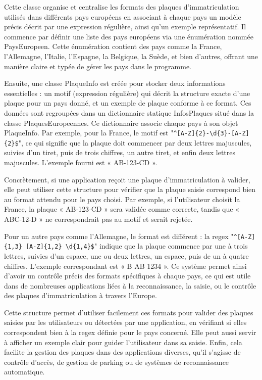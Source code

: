 \documentclass[main.tex]{subfiles}
\begin{document}
Cette classe organise et centralise les formats des plaques d’immatriculation utilisés dans différents pays européens en associant à chaque pays un modèle précis décrit par une expression régulière, ainsi qu’un exemple représentatif. Il commence par définir une liste des pays européens via une énumération nommée PaysEuropeen. Cette énumération contient des pays comme la France, l’Allemagne, l’Italie, l’Espagne, la Belgique, la Suède, et bien d’autres, offrant une manière claire et typée de gérer les pays dans le programme. 

Ensuite, une classe PlaqueInfo est créée pour stocker deux informations essentielles : un motif (expression régulière) qui décrit la structure exacte d’une plaque pour un pays donné, et un exemple de plaque conforme à ce format. Ces données sont regroupées dans un dictionnaire statique InfosPlaques situé dans la classe PlaquesEuropeennes. Ce dictionnaire associe chaque pays à son objet PlaqueInfo. Par exemple, pour la France, le motif est "\texttt{\^{}[A-Z]\{2\}-\textbackslash{}d\{3\}-[A-Z]\{2\}\$}", ce qui signifie que la plaque doit commencer par deux lettres majuscules, suivies d’un tiret, puis de trois chiffres, un autre tiret, et enfin deux lettres majuscules. L’exemple fourni est « AB-123-CD ». 

Concrètement, si une application reçoit une plaque d’immatriculation à valider, elle peut utiliser cette structure pour vérifier que la plaque saisie correspond bien au format attendu pour le pays choisi. Par exemple, si l’utilisateur choisit la France, la plaque « AB-123-CD » sera validée comme correcte, tandis que « ABC-12-D » ne correspondrait pas au motif et serait rejetée. 

Pour un autre pays comme l’Allemagne, le format est différent : la regex "\texttt{\^{}[A-Z]\{1,3\} [A-Z]\{1,2\} \textbackslash{}d\{1,4\}\$}" indique que la plaque commence par une à trois lettres, suivies d’un espace, une ou deux lettres, un espace, puis de un à quatre chiffres. L’exemple correspondant est « B AB 1234 ». Ce système permet ainsi d’avoir un contrôle précis des formats spécifiques à chaque pays, ce qui est utile dans de nombreuses applications liées à la reconnaissance, la saisie, ou le contrôle des plaques d’immatriculation à travers l’Europe. 

Cette structure permet d’utiliser facilement ces formats pour valider des plaques saisies par les utilisateurs ou détectées par une application, en vérifiant si elles correspondent bien à la regex définie pour le pays concerné. Elle peut aussi servir à afficher un exemple clair pour guider l’utilisateur dans sa saisie. Enfin, cela facilite la gestion des plaques dans des applications diverses, qu’il s’agisse de contrôle d’accès, de gestion de parking ou de systèmes de reconnaissance automatique. 
\end{document}
